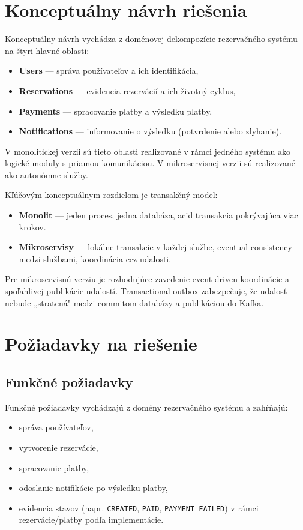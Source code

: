 \section{Konceptuálny návrh riešenia}

Konceptuálny návrh vychádza z doménovej dekompozície rezervačného systému na štyri hlavné oblasti:
\begin{itemize}
    \item \textbf{Users} — správa používateľov a ich identifikácia,
    \item \textbf{Reservations} — evidencia rezervácií a ich životný cyklus,
    \item \textbf{Payments} — spracovanie platby a výsledku platby,
    \item \textbf{Notifications} — informovanie o výsledku (potvrdenie alebo zlyhanie).
\end{itemize}

V monolitickej verzii sú tieto oblasti realizované v rámci jedného systému ako logické moduly s priamou komunikáciou. V mikroservisnej verzii sú realizované ako autonómne služby.

Kľúčovým konceptuálnym rozdielom je transakčný model:
\begin{itemize}
    \item \textbf{Monolit} — jeden proces, jedna databáza, \acrshort{acid} transakcia pokrývajúca viac krokov.
    \item \textbf{Mikroservisy} — lokálne transakcie v každej službe, eventual consistency medzi službami, koordinácia cez udalosti.
\end{itemize}

Pre mikroservisnú verziu je rozhodujúce zavedenie event-driven koordinácie a spoľahlivej publikácie udalostí. Transactional outbox zabezpečuje, že udalosť nebude „stratená" medzi commitom databázy a publikáciou do Kafka.

\section{Požiadavky na riešenie}

\subsection*{Funkčné požiadavky}

Funkčné požiadavky vychádzajú z domény rezervačného systému a zahŕňajú:
\begin{itemize}
    \item správa používateľov,
    \item vytvorenie rezervácie,
    \item spracovanie platby,
    \item odoslanie notifikácie po výsledku platby,
    \item evidencia stavov (napr. \texttt{CREATED}, \texttt{PAID}, \texttt{PAYMENT\_FAILED}) v rámci rezervácie/platby podľa implementácie.
\end{itemize}

